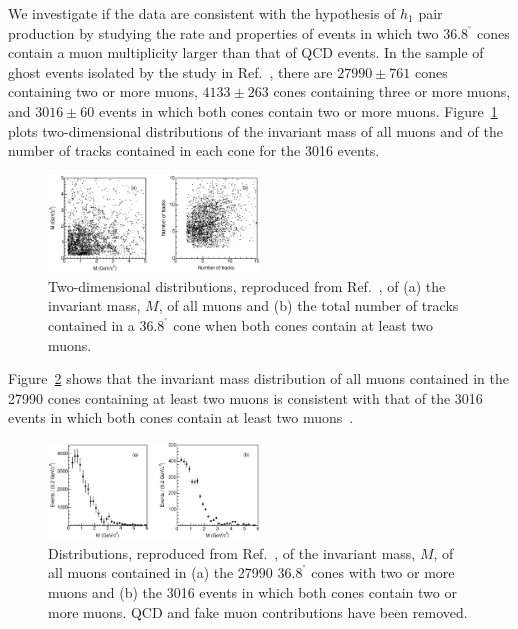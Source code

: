 \documentclass[twocolumn,10pt,prl,preprint,floatfix,nofootinbib,superscriptaddress,showpacs,amssymb]{revtex4}
\def\deg{^\circ}
\begin{document}
 We investigate if the data are consistent with the hypothesis of $h_1$ pair
 production by studying the rate and properties of events in which two
 $36.8^{\deg} $ cones contain a muon multiplicity larger than that of
 QCD events. In the sample of ghost events isolated by the study
 in Ref.~\cite{a0disc}, there are $27990\pm761$ cones containing two or
 more muons, $4133 \pm 263$ cones containing three or more muons, and
 $3016 \pm 60$ events in which both cones contain two or more muons.
 Figure~\ref{fig:fig_19} plots two-dimensional distributions of the
 invariant mass of all muons and of the number of tracks contained in
 each cone for the 3016 events.
 \begin{figure}
 \begin{center}
 \vspace{-0.3in}
 \leavevmode
 \includegraphics*[width=0.5\textwidth]{fa0_19.eps}
 \caption[]{Two-dimensional distributions, reproduced from Ref.~\cite{a0disc},
            of (a) the invariant mass, $M$, of all muons and (b) the total
            number of tracks contained in a $36.8^{\deg}$ cone when both
            cones contain at least two muons.}
 \label{fig:fig_19}
 \end{center}
 \end{figure}
 Figure~\ref{fig:fig_20} shows that the invariant mass distribution
 of all muons contained in the 27990 cones containing at least two
 muons is consistent with that of the 3016 events in which both
 cones contain at least two muons~\cite{a0disc}.  
 \begin{figure}
 \begin{center}
 \vspace{-0.3in}
 \leavevmode
 \includegraphics*[width=0.5\textwidth]{fa0_20.eps}
 \caption[]{ Distributions, reproduced from Ref.~\cite{a0disc}, of the
             invariant mass, $M$, of all muons contained in (a) the 27990
             $36.8^{\deg}$ cones with two or more muons and (b) the 3016
             events in which both cones contain two or more muons. QCD and
             fake muon contributions have been removed.}
 \label{fig:fig_20}
 \end{center}
 \end{figure}
\end{document}
